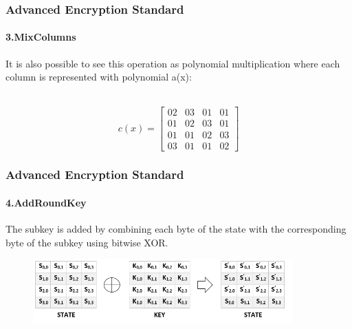 \begin{frame}
	\frametitle{Advanced Encryption Standard}
		\framesubtitle{3.MixColumns }
		
	\begin{block}{}
    	{It is also possible to see this operation as polynomial multiplication where each column is represented with 				 	polynomial a(x):}\\
		\\
		
	\end{block}
	\vfill
	\begin{block}{}
	{ $$c(x)= \left[
        \begin{array}{cccc}
         02 & 03 & 01 & 01\\
         01 & 02 & 03 & 01\\
         01 & 01 & 02 & 03\\
         03 & 01 & 01 & 02
         \end{array}
      \right] $$}
	\end{block}
\end{frame}

\begin{frame}
	\frametitle{Advanced Encryption Standard}
		\framesubtitle{4.AddRoundKey}
	\vfill
	\vspace{-0.5cm}
	\begin{block}{}
\normalsize {The subkey is added by combining each byte of the state with the corresponding byte of the subkey using bitwise XOR.}
	\end{block}
		\begin{figure}
		\vfill
		\centering
		\includegraphics[width=10cm]{addroundkey}
		\label{fig:obrazek addroundkey}
	\end{figure}
\end{frame}
